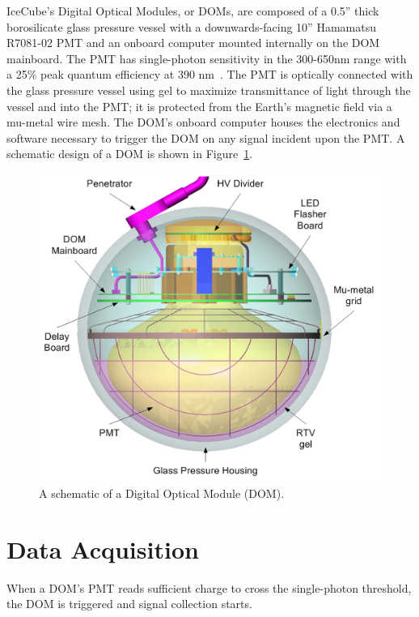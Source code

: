 \documentclass[main.tex]{subfiles}
\begin{document}
IceCube's Digital Optical Modules, or DOMs, are composed of a 0.5'' thick borosilicate glass pressure vessel with a downwards-facing 10'' Hamamatsu R7081-02 PMT and an onboard computer mounted internally on the DOM mainboard.
The PMT has single-photon sensitivity in the 300-650nm range with a 25\% peak quantum efficiency at 390 nm~\cite{ABBASI2010139}.
The PMT is optically connected with the glass pressure vessel using gel to maximize transmittance of light through the vessel and into the PMT; it is protected from the Earth's magnetic field via a mu-metal wire mesh. 
The DOM's onboard computer houses the electronics and software necessary to trigger the DOM on any signal incident upon the PMT. 
A schematic design of a DOM is shown in Figure~\ref{fig:dom_design}. 


\begin{figure}
    \centering
    \includegraphics[width=0.8\linewidth]{./figures/icecube_dom.png}
    \caption{A schematic of a Digital Optical Module (DOM).}\label{fig:dom_design}
\end{figure}

\section{Data Acquisition}

When a DOM's PMT reads sufficient charge to cross the single-photon threshold, the DOM is triggered and signal collection starts. 
\end{document}
